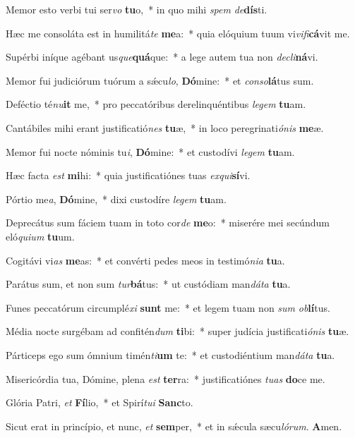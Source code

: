 ﻿\item Memor esto verbi tui ser\emph{vo} \textbf{tu}o,~* in quo mihi \emph{spem} \emph{de}\textbf{dís}ti.
\item Hæc me consoláta est in humilitá\emph{te} \textbf{me}a:~* quia elóquium tuum vi\emph{vi}\emph{fi}\textbf{cá}vit me.
\item Supérbi iníque agébant us\emph{que}\textbf{quá}que:~* a lege autem tua non \emph{de}\emph{cli}\textbf{ná}vi.
\item Memor fui judiciórum tuórum a sǽcu\emph{lo}, \textbf{Dó}mine:~* et \emph{con}\emph{so}\textbf{lá}tus sum.
\item Deféctio té\emph{nu}\textbf{it} me,~* pro peccatóribus derelinquéntibus \emph{le}\emph{gem} \textbf{tu}am.
\item Cantábiles mihi erant justificatió\emph{nes} \textbf{tu}æ,~* in loco peregrinati\emph{ó}\emph{nis} \textbf{me}æ.
\item Memor fui nocte nóminis tu\emph{i}, \textbf{Dó}mine:~* et custodívi \emph{le}\emph{gem} \textbf{tu}am.
\item Hæc facta \emph{est} \textbf{mi}hi:~* quia justificatiónes tuas \emph{ex}\emph{qui}\textbf{sí}vi.
\item Pórtio me\emph{a}, \textbf{Dó}mine,~* dixi custodíre \emph{le}\emph{gem} \textbf{tu}am.
\item Deprecátus sum fáciem tuam in toto cor\emph{de} \textbf{me}o:~* miserére mei secúndum eló\emph{qui}\emph{um} \textbf{tu}um.
\item Cogitávi vi\emph{as} \textbf{me}as:~* et convérti pedes meos in testimó\emph{ni}\emph{a} \textbf{tu}a.
\item Parátus sum, et non sum \emph{tur}\textbf{bá}tus:~* ut custódiam man\emph{dá}\emph{ta} \textbf{tu}a.
\item Funes peccatórum circumplé\emph{xi} \textbf{sunt} me:~* et legem tuam non \emph{sum} \emph{ob}\textbf{lí}tus.
\item Média nocte surgébam ad confitén\emph{dum} \textbf{ti}bi:~* super judícia justificati\emph{ó}\emph{nis} \textbf{tu}æ.
\item Párticeps ego sum ómnium timén\emph{ti}\textbf{um} te:~* et custodiéntium man\emph{dá}\emph{ta} \textbf{tu}a.
\item Misericórdia tua, Dómine, plena \emph{est} \textbf{ter}ra:~* justificatiónes \emph{tu}\emph{as} \textbf{do}ce me.
\item Glória Patri, \emph{et} \textbf{Fí}lio,~* et Spirí\emph{tu}\emph{i} \textbf{Sanc}to.
\item Sicut erat in princípio, et nunc, \emph{et} \textbf{sem}per,~* et in sǽcula sæcu\emph{ló}\emph{rum}. \textbf{A}men.